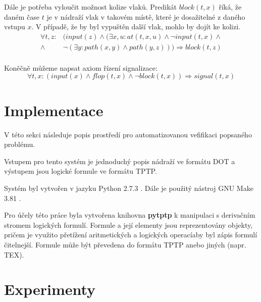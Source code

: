 \documentclass[a4paper,journal]{IEEEtran}
\begin{document}
Dále je potřeba vyloučit možnost kolize vlaků. 
Predikát $block(t,x)$ říká, že daném čase $t$ je v nádraží vlak v takovém místě, 
které je dosažitelné z daného vstupu $x$.
 V případě, že by byl vypuštěn další vlak, mohlo by dojít ke kolizi.
\begin{equation}
\begin{split}
\forall t,z:& (input(z) \wedge (\exists x,u: at(t,x,u) \wedge \neg input(t,x) \wedge\\
\wedge&\neg (\exists y: path(x,y) \wedge path(y,z) ) ) \Rightarrow block(t,z)\\
\end{split}
\end{equation}

Koněčně můžeme napsat axiom řízení signalizace:
\begin{equation}
\forall t,x: (input(x) \wedge flop(t,x) \wedge \neg block(t,x)) \Rightarrow signal(t,x)
\end{equation}

\section{Implementace}\label{sec:imple}
V této sekci následuje popis prostředí pro automatizovanou vefifikaci popsaného problému.

Vstupem pro tento systém je jednoduchý popis nádraží ve formátu DOT \cite{Graphviz} a výstupem 
jsou logické formule ve formátu TPTP\cite{TPTP}.

Systém byl vytvořen v jazyku Python 2.7.3 \cite{Python}. Dále je použitý nástroj GNU Make 3.81 \cite{GNUMake}.

Pro účely této práce byla vytvořena knihovna \textbf{pytptp} k manipulaci s derivačním stromem logických formulí.
Formule a její elementy jsou reprezentovány objekty, pričem je využito přetížení aritmetických a logických operacíaby byl zápis
formulí čitelnejší. Formule může být převedena do formátu TPTP anebo jiných (napr. TEX).

\section{Experimenty} \label{sec:exp}



	

\onecolumn
\clearpage
\appendix


\section{}
\end{document}
